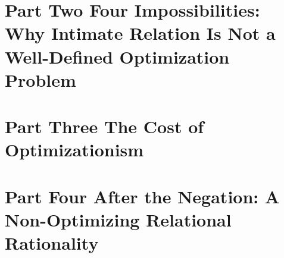 
\part*{\textcolor{rosedeep}{Part Two \quad Four Impossibilities: Why Intimate Relation Is Not a Well-Defined Optimization Problem}}


\part*{\textcolor{rosedeep}{Part Three \quad The Cost of Optimizationism}}


\part*{\textcolor{rosedeep}{Part Four \quad After the Negation: A Non-Optimizing Relational Rationality}}

